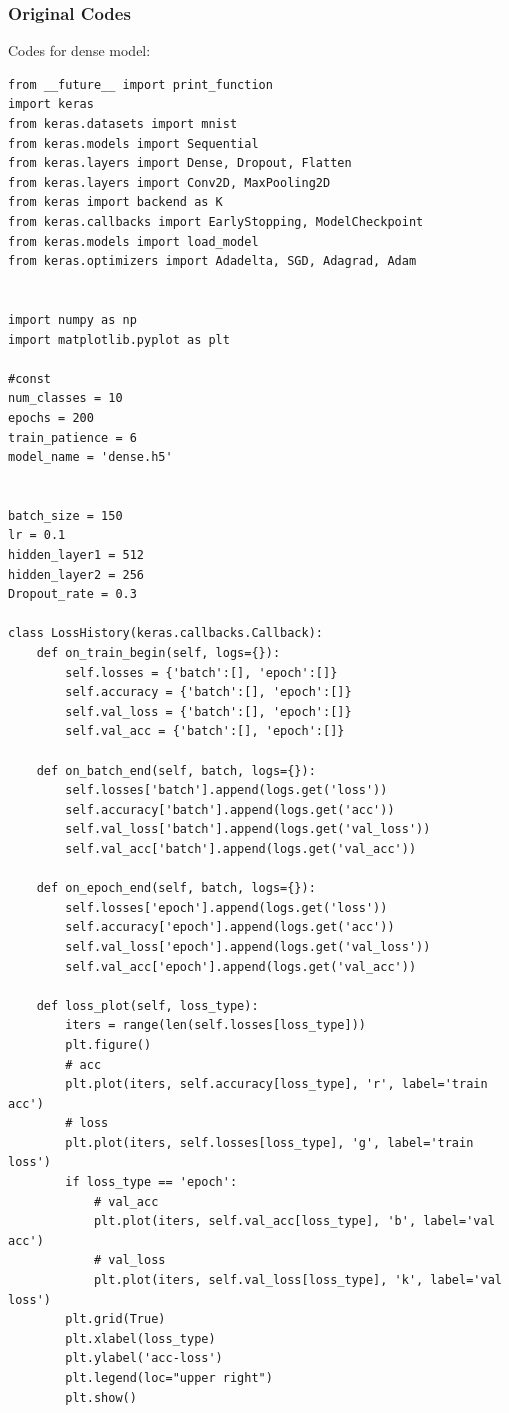 \documentclass{article}
\begin{document}
\subsubsection*{Original Codes}
Codes for dense model:
\begin{lstlisting}
from __future__ import print_function
import keras
from keras.datasets import mnist
from keras.models import Sequential
from keras.layers import Dense, Dropout, Flatten
from keras.layers import Conv2D, MaxPooling2D
from keras import backend as K
from keras.callbacks import EarlyStopping, ModelCheckpoint
from keras.models import load_model
from keras.optimizers import Adadelta, SGD, Adagrad, Adam


import numpy as np
import matplotlib.pyplot as plt

#const
num_classes = 10
epochs = 200
train_patience = 6
model_name = 'dense.h5'


batch_size = 150
lr = 0.1
hidden_layer1 = 512
hidden_layer2 = 256
Dropout_rate = 0.3

class LossHistory(keras.callbacks.Callback):
    def on_train_begin(self, logs={}):
        self.losses = {'batch':[], 'epoch':[]}
        self.accuracy = {'batch':[], 'epoch':[]}
        self.val_loss = {'batch':[], 'epoch':[]}
        self.val_acc = {'batch':[], 'epoch':[]}

    def on_batch_end(self, batch, logs={}):
        self.losses['batch'].append(logs.get('loss'))
        self.accuracy['batch'].append(logs.get('acc'))
        self.val_loss['batch'].append(logs.get('val_loss'))
        self.val_acc['batch'].append(logs.get('val_acc'))

    def on_epoch_end(self, batch, logs={}):
        self.losses['epoch'].append(logs.get('loss'))
        self.accuracy['epoch'].append(logs.get('acc'))
        self.val_loss['epoch'].append(logs.get('val_loss'))
        self.val_acc['epoch'].append(logs.get('val_acc'))

    def loss_plot(self, loss_type):
        iters = range(len(self.losses[loss_type]))
        plt.figure()
        # acc
        plt.plot(iters, self.accuracy[loss_type], 'r', label='train acc')
        # loss
        plt.plot(iters, self.losses[loss_type], 'g', label='train loss')
        if loss_type == 'epoch':
            # val_acc
            plt.plot(iters, self.val_acc[loss_type], 'b', label='val acc')
            # val_loss
            plt.plot(iters, self.val_loss[loss_type], 'k', label='val loss')
        plt.grid(True)
        plt.xlabel(loss_type)
        plt.ylabel('acc-loss')
        plt.legend(loc="upper right")
        plt.show()




\end{lstlisting}
\end{document}
